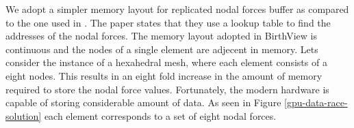  We adopt a simpler memory layout for replicated nodal forces buffer as compared to the one used in \cite{Johnsen2014}. The paper states that they use a lookup table to find the addresses of the nodal forces. The memory layout adopted in BirthView is continuous and the nodes of a single element are adjecent in memory. Lets consider the instance of a hexahedral mesh, where each element consists of a eight nodes. This results in an eight fold increase in the amount of memory required to store the nodal force values. Fortunately, the modern hardware is capable of storing considerable amount of data. As seen in Figure \ref{gpu-data-race-solution} each element corresponds to a set of eight nodal forces.

